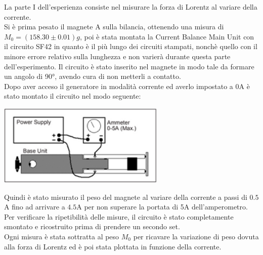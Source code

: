{\fontsize{12}{14}\selectfont 

La parte I dell'esperienza consiste nel misurare la forza di Lorentz al variare della corrente. 
\\
Si è prima pesato il magnete A sulla bilancia, ottenendo una misura di $M_0 = (158.30 \pm 0.01)g$, poi è stata montata la Current Balance Main Unit con il circuito SF42 in quanto è il più lungo dei circuiti stampati, nonchè quello con il minore errore relativo sulla lunghezza e non varierà durante questa parte dell'esperimento.
Il circuito è stato inserito nel magnete in modo tale da formare un angolo di 90°, avendo cura di non metterli a contatto.
\\
Dopo aver acceso il generatore in modalità corrente ed averlo impostato a 0A è stato montato il circuito nel modo seguente:

\par
\begin{center}
    \includegraphics[width=8cm]{Figures/Circuito.png}
\end{center}
\par

Quindi è stato misurato il peso del magnete al variare della corrente a passi di $0.5$A fino ad arrivare a $4.5$A per non superare la portata di 5A dell'amperometro. 
\\
Per verificare la ripetibilità delle misure, il circuito è stato completamente smontato e ricostruito prima di prendere un secondo set.
\\
Ogni misura è stata sottratta al peso $M_0$ per ricavare la variazione di peso dovuta alla forza di Lorentz ed è poi stata plottata in funzione della corrente.
\par}